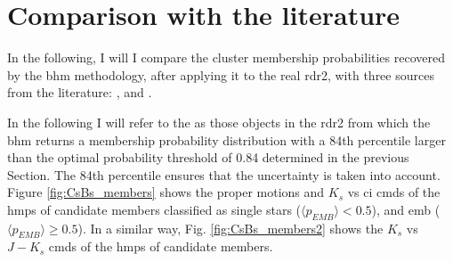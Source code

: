  
\section{Comparison with the literature}
\label{sect:memberscomparison}

In the following, I will I compare the cluster membership probabilities recovered by the \gls{bhm} methodology, after applying it to the real \gls{rdr2}, with three sources from the literature: \citet{Stauffer2007}, \citet{Bouy2015} and \citet{Rebull2016}.

In the following I will refer to the  as those objects in the \gls{rdr2} from which the \gls{bhm} returns a membership probability distribution with a 84th percentile larger than the optimal probability threshold of 0.84 determined in the previous Section. The 84th percentile ensures that the uncertainty is taken into account. Figure \ref{fig:CsBs_members} shows the proper motions and $K_s$ vs \gls{ci} \glspl{cmd} of the \gls{hmps} of candidate members classified as single stars ($\langle p_{EMB} \rangle < 0.5$), and  \gls{emb} ($\langle p_{EMB} \rangle \geq 0.5$). In a similar way, Fig. \ref{fig:CsBs_members2} shows the $K_s$ vs $J-K_s$ \glspl{cmd} of the \gls{hmps} of candidate members.

